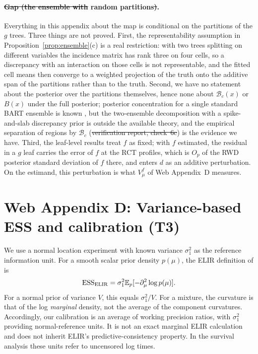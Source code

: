 \documentclass[11pt]{article}
\newcommand{\E}{\mathbb{E}}
\theoremstyle{definition}
\theoremstyle{plain}
\providecommand{\DIFaddtex}[1]{{\protect\color{blue}\uwave{#1}}} %
\providecommand{\DIFdeltex}[1]{{\protect\color{red}\sout{#1}}}                      %
\providecommand{\DIFaddbegin}{} %
\providecommand{\DIFaddend}{} %
\providecommand{\DIFdelbegin}{} %
\providecommand{\DIFdelend}{} %
\providecommand{\DIFadd}[1]{\texorpdfstring{\DIFaddtex{#1}}{#1}} %
\providecommand{\DIFdel}[1]{\texorpdfstring{\DIFdeltex{#1}}{}} %
\newcommand{\DIFscaledelfig}{0.5}
\newlength{\DIFdelgraphicswidth} %
\newlength{\DIFdelgraphicsheight} %
\newcommand{\DIFaddincludegraphics}[2][]{{\color{blue}\fbox{\DIFOincludegraphics[#1]{#2}}}} %
\newcommand{\DIFdelincludegraphics}[2][]{%
\sbox{\DIFdelgraphicsbox}{\DIFOincludegraphics[#1]{#2}}%
\settoboxwidth{\DIFdelgraphicswidth}{\DIFdelgraphicsbox} %
\settoboxtotalheight{\DIFdelgraphicsheight}{\DIFdelgraphicsbox} %
\scalebox{\DIFscaledelfig}{%
\parbox[b]{\DIFdelgraphicswidth}{\usebox{\DIFdelgraphicsbox}\\[-\baselineskip] \rule{\DIFdelgraphicswidth}{0em}}\llap{\resizebox{\DIFdelgraphicswidth}{\DIFdelgraphicsheight}{%
\setlength{\unitlength}{\DIFdelgraphicswidth}%
\begin{picture}(1,1)%
\thicklines\linethickness{2pt} %
{\color[rgb]{1,0,0}\put(0,0){\framebox(1,1){}}}%
{\color[rgb]{1,0,0}\put(0,0){\line( 1,1){1}}}%
{\color[rgb]{1,0,0}\put(0,1){\line(1,-1){1}}}%
\end{picture}%
}\hspace*{3pt}}} %
} %
\DeclareRobustCommand{\DIFaddbegin}{\DIFOaddbegin \let\includegraphics\DIFaddincludegraphics} %
\DeclareRobustCommand{\DIFaddend}{\DIFOaddend \let\includegraphics\DIFOincludegraphics} %
\DeclareRobustCommand{\DIFdelbegin}{\DIFOdelbegin \let\includegraphics\DIFdelincludegraphics} %
\DeclareRobustCommand{\DIFdelend}{\DIFOaddend \let\includegraphics\DIFOincludegraphics} %
\begin{document}
{\paragraph{\DIFdelbegin \DIFdel{Gap (the ensemble with }\DIFdelend \DIFaddbegin \DIFadd{Scope under }\DIFaddend random partitions\DIFdelbegin \DIFdel{)}\DIFdelend .}
Everything in this appendix about the map is conditional on the partitions of the $g$ trees. Three things are not proved. First, the representability assumption in Proposition~\ref{prop:ensemble}(c) is a real restriction: with two trees splitting on different variables the incidence matrix has rank three on four cells, so a discrepancy with an interaction on those cells is not representable, and the fitted cell means then converge to a weighted projection of the truth onto the additive span of the partitions rather than to the truth. Second, we have no statement about the posterior over the partitions themselves, hence none about $\mathcal B_c(x)$ or $B(x)$ under the full posterior; posterior concentration for a single standard BART ensemble is known \citep{rockova2020bart}, but the two-ensemble decomposition with a spike-and-slab discrepancy prior is outside the available theory, and the empirical separation of regions by $\mathcal B_c$ (\DIFdelbegin \DIFdel{verification report, check~6c}\DIFdelend \DIFaddbegin \DIFadd{Section~\ref{sec:sim}}\DIFaddend ) is the evidence we have. Third, the leaf-level results treat $f$ as fixed; with $f$ estimated, the residual in a $g$ leaf carries the error of $f$ at the RCT profiles, which is $O_p$ of the RWD posterior standard deviation of $f$ there, and enters $d$ as an additive perturbation. On the estimand, this perturbation is what $V^f_\mu$ of Web Appendix~D measures.

\section*{Web Appendix D: Variance-based ESS and calibration (T3)}

We use a normal location experiment with known variance $\sigma_1^2$ as the reference information unit. For a smooth scalar prior density $p(\mu)$, the ELIR definition of \citet{neuenschwander2020} is
\[
\mathrm{ESS}_{\rm ELIR}=\sigma_1^2\E_p[-\partial_\mu^2\log p(\mu)].
\]
For a normal prior of variance $V$, this equals $\sigma_1^2/V$. For a mixture, the curvature is that of the log \emph{marginal} density, not the average of the component curvatures. Accordingly, our calibration is an average of working precision ratios, with $\sigma_1^2$ providing normal-reference units. It is not an exact marginal ELIR calculation and does not inherit ELIR's predictive-consistency property. In the survival analysis these units refer to uncensored log times.

}
\end{document}
